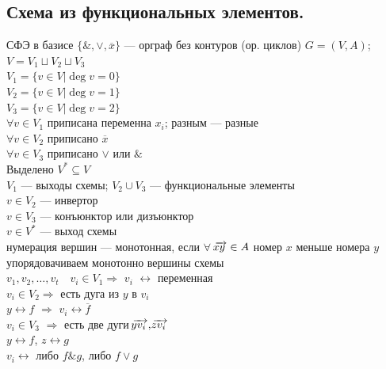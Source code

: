 \documentclass[12pt]{article}
\begin{document}
\subsection{Схема из функциональных элементов.}
	СФЭ в базисе $\{\&, \vee, \overline{x}\}$ — орграф без контуров (ор. циклов) $G = (V, A)$; $V = V_1 \sqcup V_2 \sqcup V_3$\\
	$V_1 = \{v \in V | \deg v = 0\}$\\
	$V_2 = \{v \in V | \deg v = 1\}$\\
	$V_3 = \{v \in V | \deg v = 2\}$\\
	$\forall v \in V_1$ приписана переменна $x_i$; разным — разные\\
	$\forall v \in V_2$ приписано $\overline{x}$\\
	$\forall v \in V_3$ приписано $\vee$ или $\&$\\
	Выделено $V^* \subseteq V$\\
	$V_1$ — выходы схемы; $V_2 \cup V_3$ — функциональные элементы\\
	$v \in V_2$ — инвертор\\
	$v \in V_3$ — конъюнктор или дизъюнктор\\
	$v \in V^*$ — выход схемы\\
	нумерация вершин — монотонная, если $\forall$ $\overrightarrow{\mkern -3mu xy\mkern 3mu} \in A$ номер $x$ меньше номера $y$\\
	упорядовачиваем монотонно вершины схемы\\
	$v_1,v_2,\dotsc,v_t \quad v_i \in V_1 \Rightarrow$ $v_i$ $\leftrightarrow$ переменная\\
	$v_i \in V_2 \Rightarrow$ есть дуга из $y$ в $v_i$\\
	$y \leftrightarrow f$ $\Rightarrow$ $v_i \leftrightarrow \overline{f}$\\
	$v_i \in V_3$ $\Rightarrow$ есть две дуги $\overrightarrow{\mkern -3mu yv_i\mkern 3mu}, \overrightarrow{\mkern -3mu zv_i\mkern 3mu}$\\
	$y \leftrightarrow f$, $z \leftrightarrow g$\\
	$v_i \leftrightarrow$ либо $f \& g$, либо $f \vee g$\\
\end{document}
